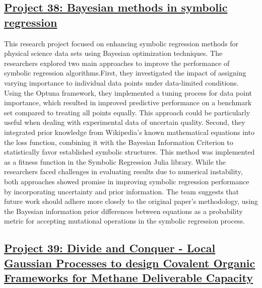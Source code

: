  \subsection*{\href{https://www.youtube.com/watch?v=KKxlqo15wVY}{Project 38: Bayesian methods in symbolic regression}}

This research project focused on enhancing symbolic regression methods for physical science data sets using Bayesian optimization techniques. The researchers explored two main approaches to improve the performance of symbolic regression algorithms.First, they investigated the impact of assigning varying importance to individual data points under data-limited conditions. Using the Optuna framework, they implemented a tuning process for data point importance, which resulted in improved predictive performance on a benchmark set compared to treating all points equally. This approach could be particularly useful when dealing with experimental data of uncertain quality. Second, they integrated prior knowledge from Wikipedia's known mathematical equations into the loss function, combining it with the Bayesian Information Criterion to statistically favor established symbolic structures. This method was implemented as a fitness function in the Symbolic Regression Julia library. While the researchers faced challenges in evaluating results due to numerical instability, both approaches showed promise in improving symbolic regression performance by incorporating uncertainty and prior information. The team suggests that future work should adhere more closely to the original paper's methodology, using the Bayesian information prior differences between equations as a probability metric for accepting mutational operations in the symbolic regression process.
 \subsection*{\href{https://www.youtube.com/watch?v=iog-07Ekp9g}{Project 39: Divide and Conquer - Local Gaussian Processes to design Covalent Organic Frameworks for Methane Deliverable Capacity}}

